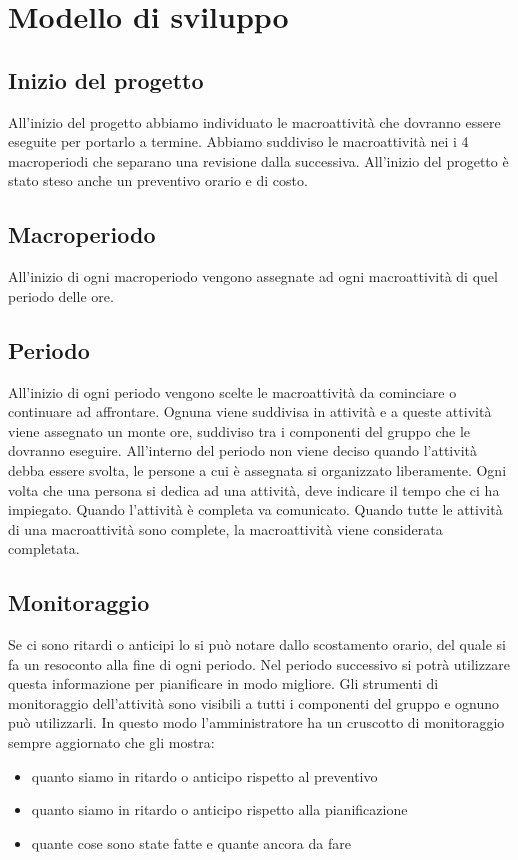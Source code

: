 \section{Modello di sviluppo}


\subsection{Inizio del progetto}
All'inizio del progetto abbiamo individuato le macroattività che dovranno essere eseguite per portarlo a termine.
Abbiamo suddiviso le macroattività nei i 4 macroperiodi che separano una revisione dalla successiva.
All'inizio del progetto è stato steso anche un preventivo orario e di costo.
\subsection{Macroperiodo}
All'inizio di ogni macroperiodo vengono assegnate ad ogni macroattività di quel periodo delle ore.
\subsection{Periodo}
All'inizio di ogni periodo vengono scelte le macroattività da cominciare o continuare ad affrontare.
Ognuna viene suddivisa in attività e a queste attività viene assegnato un monte ore, suddiviso tra i componenti del gruppo che le dovranno eseguire.
All'interno del periodo non viene deciso quando l'attività debba essere svolta, le persone a cui è assegnata si organizzato liberamente.
Ogni volta che una persona si dedica ad una attività, deve indicare il tempo che ci ha impiegato.
Quando l'attività è completa va comunicato.
Quando tutte le attività di una macroattività sono complete, la macroattività viene considerata completata.

\subsection{Monitoraggio}
Se ci sono ritardi o anticipi lo si può notare dallo scostamento orario, del quale si fa un resoconto alla fine di ogni periodo. Nel periodo successivo si potrà utilizzare questa informazione per pianificare in modo migliore.
Gli strumenti di monitoraggio dell'attività sono visibili a tutti i componenti del gruppo e ognuno può utilizzarli. In questo modo l'amministratore ha un cruscotto di monitoraggio sempre aggiornato che gli mostra:
\begin{itemize}
	\item quanto siamo in ritardo o anticipo rispetto al preventivo
	\item quanto siamo in ritardo o anticipo rispetto alla pianificazione
	\item quante cose sono state fatte e quante ancora da fare
\end{itemize}


